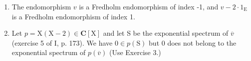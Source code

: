 \begin{enumerate}
\def\labelenumi{\alph{enumi})}
\item
  The endomorphism \(v\) is a Fredholm endomorphism of index -1, and \(v - 2 \cdot 1_{\mathrm{E}}\) is a Fredholm endomorphism of index 1.
\item
  Let \(p = \mathrm{X}(\mathrm{X} - 2) \in \mathbf{C}[\mathrm{X}]\) and let S be the exponential spectrum of \(\overline{v}\) (exercise 5 of I, p. 173). We have \(0 \in p(\mathrm{S})\) but 0 does not belong to the exponential spectrum of \(p(\overline{v})\) (Use Exercise 3.)
\end{enumerate}

